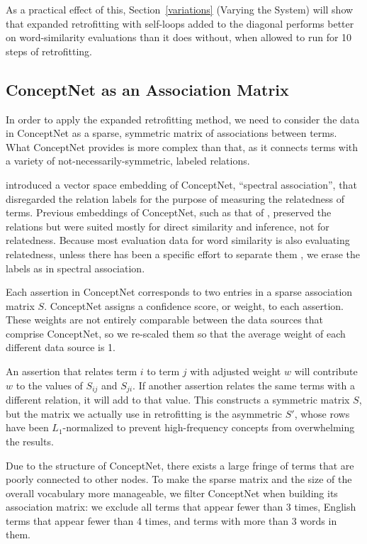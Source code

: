 \documentclass[11pt,letterpaper]{article}
\begin{document}
As a practical effect of this, Section~\ref{variations} (Varying the System)
will show that expanded retrofitting with self-loops added to the diagonal
performs better on word-similarity evaluations than it does without, when
allowed to run for 10 steps of retrofitting.


\subsection{ConceptNet as an Association Matrix}

In order to apply the expanded retrofitting method, we need to consider the data in
ConceptNet as a sparse, symmetric matrix of associations between terms. What
ConceptNet provides is more complex than that, as it connects terms with a
variety of not-necessarily-symmetric, labeled relations.

 introduced a vector space embedding of ConceptNet,
``spectral association'', that disregarded the relation labels for the purpose
of measuring the relatedness of terms. Previous embeddings of ConceptNet, such
as that of , preserved the relations but were
suited mostly for direct similarity and inference, not for relatedness. Because
most evaluation data for word similarity is also evaluating relatedness, unless
there has been a specific effort to separate them \cite{agirre2009similarity},
we erase the labels as in spectral association.

Each assertion in ConceptNet corresponds to two entries in a sparse
association matrix $S$.  ConceptNet assigns a confidence score, or weight, to
each assertion.  These weights are not entirely comparable between the data
sources that comprise ConceptNet, so we re-scaled them so that the average
weight of each different data source is 1.

An assertion that relates term $i$ to term $j$ with adjusted weight $w$ will
contribute $w$ to the values of $S_{ij}$ and $S_{ji}$. If another assertion
relates the same terms with a different relation, it will add to that value.
This constructs a symmetric matrix $S$, but the matrix we actually use in
retrofitting is the asymmetric $S'$, whose rows have been $L_1$-normalized to
prevent high-frequency concepts from overwhelming the results.

Due to the structure of ConceptNet, there exists a large fringe of terms that are
poorly connected to other nodes. To make the sparse matrix and the size of the
overall vocabulary more manageable, we filter ConceptNet when building its
association matrix: we exclude all terms that appear fewer than 3 times, English
terms that appear fewer than 4 times, and terms with more than 3 words in them.
\end{document}
